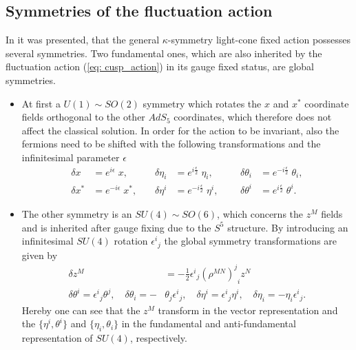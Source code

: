\subsection{Symmetries of the fluctuation action}
In \cite{Metsaev:2000yu} it was presented, that the general $\kappa$-symmetry light-cone fixed action possesses several symmetries. Two fundamental ones, which are also inherited by the fluctuation action (\ref{eq: cusp_action}) in its gauge fixed status, are global symmetries.
%
\begin{itemize}
\item At first a $U(1)\sim SO(2)$ symmetry which rotates the $x$ and $x^{*}$ coordinate fields orthogonal to the other $AdS_{5}$ coordinates, which therefore does not affect the classical solution. In order for the action to be invariant, also the fermions need to be shifted with the following transformations and the infinitesimal parameter $\epsilon$
%
%
\begin{equation}
\begin{alignedat}{9}
\delta x &= e^{i\epsilon}\; x, \qquad&  \delta\eta_{i}&= e^{i\frac{\epsilon}{2}}\; \eta_{i}, \qquad&  \delta\theta_{i} &= e^{-i\frac{\epsilon}{2}}\; \theta_{i},\\
\delta x^{*} &= e^{-i\epsilon}\; x^{*}, &  \delta\eta^{i}&= e^{-i\frac{\epsilon}{2}}\; \eta^{i}, &  \delta\theta^{i} &= e^{i\frac{\epsilon}{2}}\; \theta^{i}. 
\label{eq: U1_sym}
\end{alignedat}
\end{equation}
%
%
\item The other symmetry is an $SU(4)\sim SO(6)$, which concerns the $z^{M}$ fields and is inherited after gauge fixing due to the $S^{5}$ structure. By introducing an infinitesimal $SU(4)$ rotation ${\epsilon^{i}}_{j}$ the global symmetry transformations are given by
%
%
\begin{equation}
\begin{alignedat}{9}
\delta z^{M} &= -\frac{1}{2} {\epsilon^{i}}_{j} {(\rho^{MN})^{j}}_{i} z^{N}   \\
\delta \theta^{i} = {\epsilon^{i}}_{j} \theta ^{j}, \quad \delta \theta_{i} = -& \theta_{j} {\epsilon^{i}}_{j}, \quad  
\delta \eta ^{i} = {\epsilon^{i}}_{j} \eta^{i}, \quad  \delta \eta_{i}= - \eta_{i} {\epsilon^{i}}_{j}. 
\end{alignedat}
\end{equation}
%
%
Hereby one can see that the $z^{M}$ transform in the vector representation and the $\lbrace \eta^{i},\theta^{i}\rbrace$ and $\lbrace \eta_{i},\theta_{i}\rbrace$ in the fundamental and anti-fundamental representation of $SU(4)$, respectively.
\end{itemize}
%
%
%
%
%
%
%
%
%
